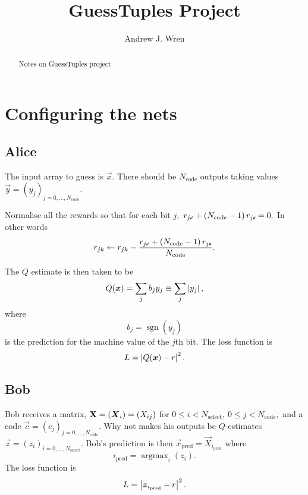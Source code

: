 \documentclass[12pt]{article}
\title{GuessTuples Project}
\author{Andrew J. Wren}
\begin{document}
\maketitle

\begin{abstract}
	Notes on GuessTuples project
\end{abstract}


\section{Configuring the nets}

\subsection{Alice}

The input array to guess is $\vec{x}.$  There should be $N_\text{code}$ outputs taking values $\vec{y} = (y_j)_{j=0,...,N_\text{code}}.$

Normalise all the rewards so that for each bit $j,$ $\rt{j} + \left(N_\text{code} - 1\right)\rf{j} = 0.$  In other words
\begin{equation}
	r_{jk}
	\gets
	r_{jk} - \frac{ \rt{j} + \left(N_\text{code} - 1\right)\rf{j}}{N_\text{code}}
	.
\end{equation}

The $Q$ estimate is then taken to be
\begin{equation}
	Q(\boldsymbol{x})
	=
	\sum_j b_j y_j
	\equiv
	\sum_j \left\lvert y_j \right\rvert
	,		
\end{equation}
where
\begin{equation}
	b_j = \operatorname{sgn} (y_j)
\end{equation}
is the prediction for the machine value of the $j$th bit.  The loss function is
\begin{equation}
	L
	=
	\left\lvert Q(\boldsymbol{x}) -r \right\rvert^2
	. 
\end{equation}

\subsection{Bob}

Bob receives a matrix, $\mathbf{X} = (\boldsymbol{X}_{i}) = (X_{ij})$ for $0\leq i < N_\text{select},\ 0\leq j < N_\text{code},$ and a code $\vec{c}=(c_j)_{j=0,...,N_\text{code}}.$  Why not makes his outputs be $Q$-estimates $\vec{z} = (z_i)_{i=0,...,N_\text{select}}.$ Bob's prediction is then
$
	\vec{x}_\text{pred}
=
\vec{X}_{i_\text{pred}}
$
where
\begin{equation}
	i_\text{pred}
	=
	\operatorname{argmax}_{i}  (z_i)
	.
\end{equation}
The loss function is 
\begin{equation}	\label{eq:Bob_loss_fn}
	L
	=
	\left\lvert \boldsymbol{z}_{i_\text{pred}} -r \right\rvert^2
	. 
\end{equation}
\end{document}

